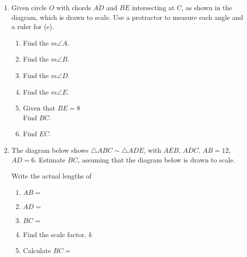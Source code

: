 \begin{enumerate}
\item Given circle $O$ with chords $\overline{AD}$ and $\overline{BE}$ intersecting at $C$, as shown in the diagram, which is drawn to scale. Use a protractor to measure each angle and a ruler for (e).
    \begin{multicols}{2}
    \raggedcolumns
    \begin{enumerate}[itemsep=1cm]
      \item Find the $m\angle A$.
      \item Find the $m\angle B$.
      \item Find the $m\angle D$.
      \item Find the $m\angle E$.
      \item Given that $BE=8$ \\[0.25cm] 
      Find $BC$.
      \item Find $EC$.
    \end{enumerate}
    \end{multicols}
  \vspace{2cm}

\item The diagram below shows $\triangle ABC \sim \triangle ADE$, with $\overline{AEB}$, $\overline{ADC}$. $AB=12$, $AD=6$. Estimate $BC$, assuming that the diagram below is drawn to scale.
\begin{multicols}{2}
  Write the actual lengths of 
  \begin{enumerate}
    \item $AB=$ \vspace{0.7cm}
    \item $AD=$ \vspace{0.7cm}
    \item $BC=$  \vspace{0.7cm}
    \item Find the scale factor, $k$ \vspace{1.2cm}
    \item Calculate $BC=$
  \end{enumerate}
  \end{multicols}\vspace{1.5cm}



\end{enumerate}
